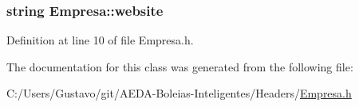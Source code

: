 \hypertarget{class_empresa_a809624b98d1db18f8627ce2fa394dddd}{
\subsubsection[{website}]{\setlength{\rightskip}{0pt plus 5cm}string Empresa\+::website\hspace{0.3cm}{\ttfamily [private]}}}\label{class_empresa_a809624b98d1db18f8627ce2fa394dddd}


Definition at line 10 of file Empresa.\+h.



The documentation for this class was generated from the following file\+:\begin{DoxyCompactItemize}
\item 
C\+:/\+Users/\+Gustavo/git/\+A\+E\+D\+A-\/\+Boleias-\/\+Inteligentes/\+Headers/\hyperlink{_empresa_8h}{Empresa.\+h}\end{DoxyCompactItemize}
